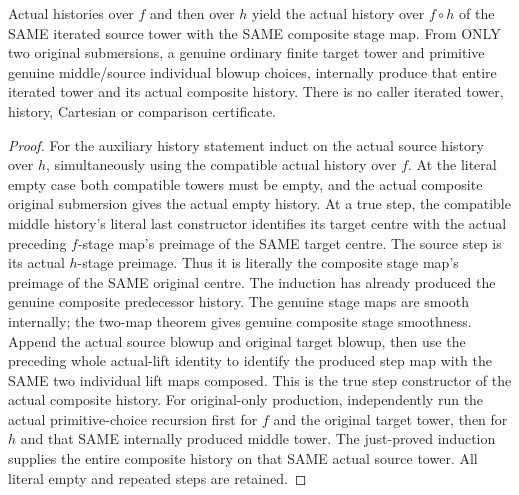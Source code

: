 \begin{theorem}
\label{hir:submersion-tower-composition-actual-history}
\leanok
{}
Actual histories over $f$ and then over $h$ yield the actual history over
$f\circ h$ of the SAME iterated source tower with the SAME composite stage
map. From ONLY two original submersions, a genuine ordinary finite target
tower and primitive genuine middle/source individual blowup choices,
internally produce that entire iterated tower and its actual composite history.
There is no caller iterated tower, history, Cartesian or comparison certificate.
\end{theorem}
\begin{proof}
For the auxiliary history statement induct on the actual source history
over $h$, simultaneously using the compatible actual history over $f$.
At the literal empty case both compatible towers must be empty, and the
actual composite original submersion gives the actual empty history.
At a true step, the compatible middle history's literal last constructor
identifies its target centre with the actual preceding $f$-stage map's
preimage of the SAME target centre. The source step is its actual $h$-stage
preimage. Thus it is literally the composite stage map's preimage of the
SAME original centre. The induction has already produced the genuine
composite predecessor history. The genuine stage maps are smooth internally;
the two-map theorem gives genuine composite stage smoothness. Append the
actual source blowup and original target blowup, then use the preceding
whole actual-lift identity to identify the produced step map with the SAME
two individual lift maps composed. This is the true step constructor of
the actual composite history. For original-only production, independently
run the actual primitive-choice recursion first for $f$ and the original
target tower, then for $h$ and that SAME internally produced middle tower.
The just-proved induction supplies the entire composite history on that
SAME actual source tower. All literal empty and repeated steps are retained.
\end{proof}

